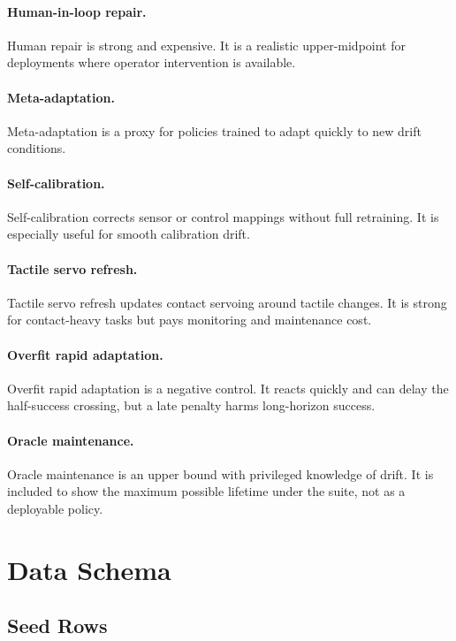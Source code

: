 \documentclass{article}
\begin{document}
\paragraph{Human-in-loop repair.}
Human repair is strong and expensive. It is a realistic upper-midpoint for
deployments where operator intervention is available.

\paragraph{Meta-adaptation.}
Meta-adaptation is a proxy for policies trained to adapt quickly to new drift
conditions.

\paragraph{Self-calibration.}
Self-calibration corrects sensor or control mappings without full retraining.
It is especially useful for smooth calibration drift.

\paragraph{Tactile servo refresh.}
Tactile servo refresh updates contact servoing around tactile changes. It is
strong for contact-heavy tasks but pays monitoring and maintenance cost.

\paragraph{Overfit rapid adaptation.}
Overfit rapid adaptation is a negative control. It reacts quickly and can delay
the half-success crossing, but a late penalty harms long-horizon success.

\paragraph{Oracle maintenance.}
Oracle maintenance is an upper bound with privileged knowledge of drift. It is
included to show the maximum possible lifetime under the suite, not as a
deployable policy.

\section{Data Schema}

\subsection{Seed Rows}
\end{document}
